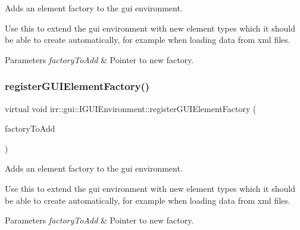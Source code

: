 Adds an element factory to the gui environment. 

Use this to extend the gui environment with new element types which it should be able to create automatically, for example when loading data from xml files. 
\begin{DoxyParams}{Parameters}
{\em factory\+To\+Add} & Pointer to new factory. \\
\hline
\end{DoxyParams}
\mbox{\label{classirr_1_1gui_1_1IGUIEnvironment_a653ac2cc8640899c23f4d55d9a5f0fdd}} 
\subsubsection{\texorpdfstring{register\+G\+U\+I\+Element\+Factory()}{registerGUIElementFactory()}\hspace{0.1cm}{\footnotesize\ttfamily [2/2]}}
{\footnotesize\ttfamily virtual void irr\+::gui\+::\+I\+G\+U\+I\+Environment\+::register\+G\+U\+I\+Element\+Factory (\begin{DoxyParamCaption}\item[{\hyperlink{classirr_1_1gui_1_1IGUIElementFactory}{I\+G\+U\+I\+Element\+Factory} $\ast$}]{factory\+To\+Add }\end{DoxyParamCaption})\hspace{0.3cm}{\ttfamily [pure virtual]}}



Adds an element factory to the gui environment. 

Use this to extend the gui environment with new element types which it should be able to create automatically, for example when loading data from xml files. 
\begin{DoxyParams}{Parameters}
{\em factory\+To\+Add} & Pointer to new factory. \\
\hline
\end{DoxyParams}
\mbox{\label{classirr_1_1gui_1_1IGUIEnvironment_ab2100753b415a9950d95572d4623bf46}} 
